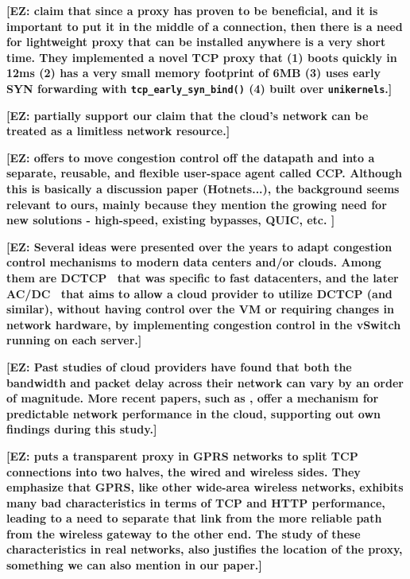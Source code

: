\documentclass[10pt,sigconf]{acmart}
\newcommand{\mycomm}[3]{{\color{#2} \textbf{[#1: #3]}}}
\newcommand{\mycomm}[3]{}
\newcommand{\EZ}[1]{\mycomm{EZ}{teal}{#1}}
\begin{document}
\EZ{ \cite{siracusano2016miniproxy} claim that since a proxy has proven to be beneficial, and it is important to put it in the middle of a connection, then there is a need for lightweight proxy that can be installed anywhere is a very short time. They implemented a novel TCP proxy that (1) boots quickly in 12ms (2) has a very small memory footprint of 6MB (3) uses early SYN forwarding with \texttt{tcp\_early\_syn\_bind()} (4) built over \texttt{unikernels}.}

\EZ{ \cite{jeyakumar2012eyeq} partially support our claim that the cloud's network can be treated as a limitless network resource.}

\EZ{ \cite{narayan2017ccp} offers to move congestion control off the datapath and into a separate, reusable,
and flexible user-space agent called CCP. Although this is basically a discussion paper (Hotnets...), the background seems relevant to ours, mainly because they mention the growing need for new solutions - high-speed, existing bypasses, QUIC, etc. }

\EZ{ Several ideas were presented over the years to adapt congestion control mechanisms to modern data centers and/or clouds. Among them are DCTCP~\cite{alizadeh2010dctcp} that was specific to fast datacenters, and the later AC/DC~\cite{keqiang2016acdc} that aims to allow a cloud provider to utilize DCTCP (and similar), without having control over the VM or requiring changes in network hardware, by implementing congestion control in the vSwitch running on each server.}

\EZ{Past studies of cloud providers have found that both the bandwidth and packet delay across their network can vary by an order of magnitude. More recent papers, such as \cite{jang2015silo}, offer a mechanism for predictable network performance in the cloud, supporting out own findings during this study.}

\EZ{\cite{chakravorty2003aggregation} puts a transparent proxy in GPRS networks to split TCP connections into two halves, the wired and wireless sides. They emphasize that GPRS, like other wide-area wireless networks, exhibits many bad characteristics in terms of TCP and HTTP performance, leading to a need to separate that link from the more reliable path from the wireless gateway to the other end. The study of these characteristics in real networks, also justifies the location of the proxy, something we can also mention in our paper.}
\end{document}
